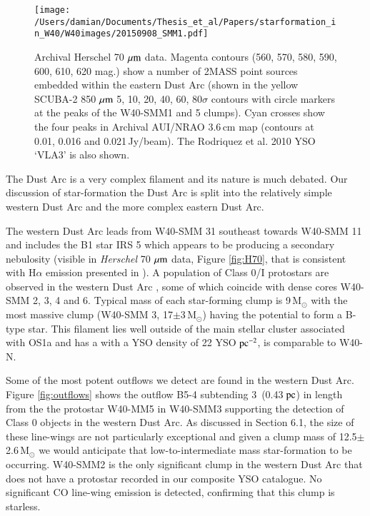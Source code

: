 \begin{figure}
\begin{centering}
\texttt{[image: /Users/damian/Documents/Thesis\_et\_al/Papers/starformation\_in\_W40/W40images/20150908\_SMM1.pdf]}
\caption{Archival Herschel 70\,$\,\mu\rm{m}$ data. Magenta contours (560, 570, 580, 590, 600, 610, 620 mag.) show a number of 2MASS point sources embedded within the eastern Dust Arc (shown in the yellow SCUBA-2 850\,$\,\mu\rm{m}$ 5, 10, 20, 40, 60, 80$\sigma$ contours with circle markers at the peaks of the W40-SMM1 and 5 clumps). Cyan crosses show the four peaks in Archival AUI/NRAO 3.6\,cm map (contours at 0.01, 0.016 and 0.021\,Jy/beam). The Rodriquez et al. 2010 YSO `VLA3' is also shown.} 
\label{fig:SMM1}
\end{centering}
\end{figure} 

The Dust Arc is a very complex filament and its nature is much debated. Our discussion 
of star-formation the Dust Arc is split into the relatively simple western Dust Arc and the 
more complex eastern Dust Arc. 

The western Dust Arc leads from W40-SMM 31 southeast towards W40-SMM 11 and includes 
the B1 star IRS 5 which appears to be producing a secondary nebulosity (visible in \emph{Herschel} 
70\,$\,\mu\rm{m}$ data, Figure \ref{fig:H70}, that is consistent with H$\alpha$ emission presented in 
\cite{Mallick:2013kx}). A population of Class 0/I protostars are observed in the western Dust Arc 
\citep{Maury:2011ys}, some of which coincide with dense cores W40-SMM 2, 3, 4 and 6. 
Typical mass of each star-forming clump is 9\,M$_{\odot}$ with the most massive clump (W40-SMM 3, 
17$\pm$3\,M$_{\odot}$) having the potential to form a B-type star. This filament lies well outside 
of the main stellar cluster associated with OS1a and has a with a YSO density of 22 YSO$\hbox{ 
pc$^{-2}$}$, is comparable to W40-N. 

Some of the most potent outflows we detect are found in the western Dust Arc. Figure 
\ref{fig:outflows} shows the outflow B5-4 subtending 3\arcmin\ (0.43$\hbox{ pc}$) in 
length from the the protostar W40-MM5 \citep{Maury:2011ys} in W40-SMM3 supporting 
the detection of Class 0 objects in the western Dust Arc. As discussed in Section 6.1, 
the size of these line-wings are not particularly exceptional and given a clump mass of 
12.5$\pm$2.6\,M$_{\odot}$ we would anticipate that low-to-intermediate mass star-formation 
to be occurring. W40-SMM2 is the only significant clump in the western Dust Arc that 
does not have a protostar recorded in our composite YSO catalogue. No significant CO 
line-wing emission is detected, confirming that this clump is starless. 

